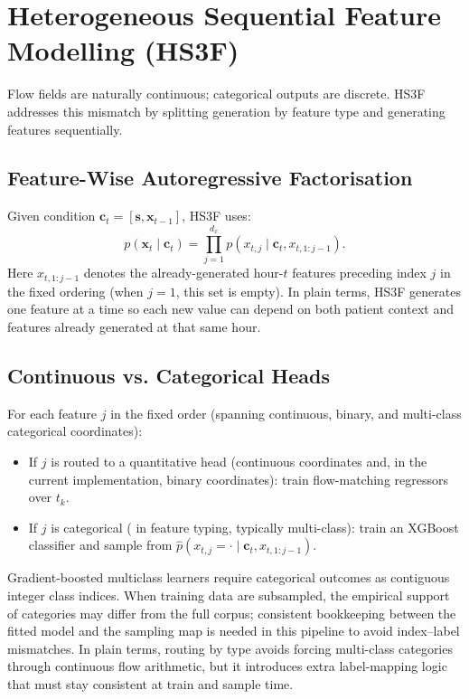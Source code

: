 \section{Heterogeneous Sequential Feature Modelling (HS3F)}
\label{sec:hs3f}

Flow fields are naturally continuous; categorical outputs are discrete.
HS3F \cite{akazan2024hs3f} addresses this mismatch by splitting generation by feature type and generating features sequentially.

\subsection{Feature-Wise Autoregressive Factorisation}

Given condition $\mathbf{c}_t=[\mathbf{s},\mathbf{x}_{t-1}]$, HS3F uses:
\begin{equation}
p(\mathbf{x}_t \mid \mathbf{c}_t)=\prod_{j=1}^{d_x}p(x_{t,j}\mid \mathbf{c}_t, x_{t,1:j-1}).
\end{equation}
Here $x_{t,1:j-1}$ denotes the already-generated hour-$t$ features preceding index $j$ in the fixed ordering (when $j=1$, this set is empty).
In plain terms, HS3F generates one feature at a time so each new value can depend on both patient context and features already generated at that same hour.

\subsection{Continuous vs. Categorical Heads}

For each feature $j$ in the fixed order (spanning continuous, binary, and multi-class categorical coordinates):
\begin{itemize}\tightlist
    \item If $j$ is routed to a quantitative head (continuous coordinates and, in the current implementation, binary coordinates): train flow-matching regressors over $t_k$.
    \item If $j$ is categorical ( in feature typing, typically multi-class): train an XGBoost classifier and sample from $\hat{p}(x_{t,j}=\cdot\mid \mathbf{c}_t, x_{t,1:j-1})$.
\end{itemize}

Gradient-boosted multiclass learners require categorical outcomes as contiguous integer class indices.
When training data are subsampled, the empirical support of categories may differ from the full corpus; consistent bookkeeping between the fitted model and the sampling map is needed in this pipeline to avoid index--label mismatches.
In plain terms, routing by type avoids forcing multi-class categories through continuous flow arithmetic, but it introduces extra label-mapping logic that must stay consistent at train and sample time.

